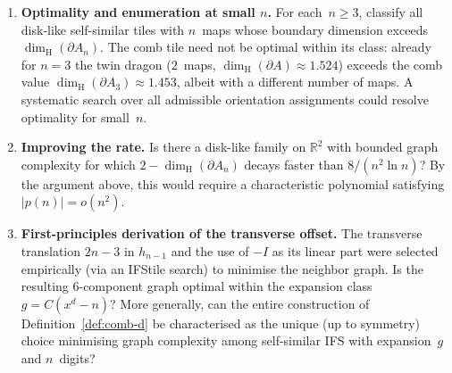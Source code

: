 \documentclass{amsart}
\theoremstyle{definition}
\theoremstyle{remark}
\newcommand{\R}{\mathbb{R}}
\newcommand{\dH}{\dim_{\mathrm{H}}}
\begin{document}
\begin{enumerate}
\item \textbf{Optimality and enumeration at small $n$.}
For each~$n \ge 3$, classify all disk-like self-similar tiles
with $n$~maps whose boundary dimension exceeds
$\dH(\partial A_n)$.  The comb tile need not be optimal within
its class: already for $n = 3$ the twin dragon ($2$~maps,
$\dH(\partial A) \approx 1.524$) exceeds the comb value
$\dH(\partial A_3) \approx 1.453$, albeit with a different number
of maps.  A systematic search over all admissible orientation
assignments could resolve optimality for small~$n$.

\item \textbf{Improving the rate.}
Is there a disk-like family on $\R^2$ with bounded graph
complexity for which $2 - \dH(\partial A_n)$ decays faster than
$8/(n^2 \ln n)$?  By the argument above, this would require a
characteristic polynomial satisfying $|p(n)| = o(n^2)$.

\item \textbf{First-principles derivation of the
  transverse offset.}
The transverse translation $2n{-}3$ in $h_{n-1}$ and the use
of $-I$ as its linear part were selected empirically (via an
IFStile search) to minimise the neighbor graph.  Is the
resulting $6$-component graph optimal within the expansion
class $g = C(x^d - n)$?  More generally, can the entire
construction of Definition~\ref{def:comb-d} be characterised as
the unique (up to symmetry) choice minimising graph complexity
among self-similar IFS with expansion~$g$ and $n$~digits?

\end{enumerate}
\end{document}
